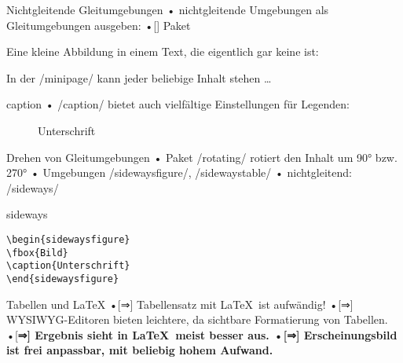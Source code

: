 \begin{frame}[fragile]{Nichtgleitende Gleitumgebungen}
• nichtgleitende Umgebungen als Gleitumgebungen ausgeben:
•[] Paket 
\•
\begin{LTXexample}[pos=b]
Eine kleine Abbildung in einem Text, die eigentlich gar keine ist:
\begin{minipage}[b]{3cm}
\end{minipage}
In der /minipage/ kann jeder beliebige Inhalt stehen \dots
\end{LTXexample}
\end{frame}

\begin{frame}[fragile]{caption}
• /caption/ bietet auch vielfältige Einstellungen für Legenden:
\•
\begin{LTXexample}[pos=b]
\captionsetup[figure]{textfont=bf, labelsep=period}

\captionsetup[table]{textfont=it,singlelinecheck=false,
labelsep=newline,format=plain,justification=justified}

\begin{figure}
\caption{Unterschrift}\end{figure}
\end{LTXexample}
\end{frame}

\begin{frame}[fragile]{Drehen von Gleitumgebungen}
• Paket /rotating/ rotiert den Inhalt um 90° bzw. 270°
• Umgebungen /sidewaysfigure/, /sidewaystable/
• nichtgleitend: /sideways/
\•
\begin{LTXexample}[width=.4\textwidth]
\centering
\begin{sideways}
[Bild]
\end{sideways}
\end{LTXexample}
\end{frame}

\begin{frame}[fragile]{sideways}
\begin{lstlisting}
\begin{sidewaysfigure}
\fbox{Bild}
\caption{Unterschrift}
\end{sidewaysfigure}
\end{lstlisting}
\end{frame}

\begin{frame}{Tabellen und \LaTeX}
•[\color{red}⇒] Tabellensatz mit \LaTeX\ ist aufwändig!
•[\color{red}⇒] WYSIWYG-Editoren bieten leichtere, da sichtbare Formatierung von Tabellen.
•[\bf \color{green}⇒] Ergebnis sieht in \LaTeX\ meist besser aus.
•[\color{green}⇒] Erscheinungsbild ist frei anpassbar, mit beliebig hohem Aufwand.
\•
\end{frame}

